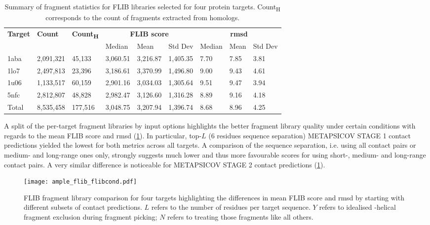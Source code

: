 \begin{table}[H]
  \centering
  \scriptsize
  \caption[FLIB fragment characterics across four protein targets]{Summary of fragment statistics for FLIB libraries selected for four protein targets. Count\textsubscript{H} corresponds to the count of fragments extracted from homologs.}
  \label{table:ample_flib_frag_summary}
  \begin{tabularx}{\textwidth}{X X X X X X X X X}
      \hline
      \multirow{2}{*}{\textbf{Target}} & \multirow{2}{*}{\textbf{Count}} & \multirow{2}{*}{\textbf{Count\textsubscript{H}}} & \multicolumn{3}{c}{\textbf{FLIB score}} & \multicolumn{3}{c}{\textbf{\gls{rmsd}}} \\ \cline{4-9}
      		&			&			& Median 	& Mean 		& Std Dev 	& Median 	& Mean 	& Std Dev \\
      \hline
      1aba	& 2,091,321	& 45,133		& 3,060.51	& 3,216.87	& 1,405.35	& 7.70	& 7.85	& 3.81	\\
	  1lo7	& 2,497,813	& 23,396		& 3,186.61	& 3,370.99	& 1,496.80	& 9.00	& 9.43	& 4.61	\\
      1u06	& 1,133,517	& 60,159		& 2,901.16	& 3,034.03	& 1,305.64	& 9.51	& 9.47	& 3.94	\\
      5nfc	& 2,812,807	& 48,828		& 2,982.47	& 3,126.60	& 1,316.28	& 8.89	& 9.16	& 4.18	\\
      \hline
      Total	& 8,535,458	& 177,516	& 3,048.75	& 3,207.94	& 1,396.74	& 8.68	& 8.96	& 4.25	\\
      \hline
  \end{tabularx}
\end{table}

A split of the per-target fragment libraries by input options highlights the better fragment library quality under certain conditions with regards to the mean FLIB score and \gls{rmsd} (\cref{fig:ample_flib_flibcond}). In particular, top-$L$ (6 residues sequence separation) METAPSICOV STAGE 1 contact predictions yielded the lowest for both metrics across all targets. A comparison of the sequence separation, i.e. using all contact pairs or medium- and long-range ones only, strongly suggests much lower and thus more favourable scores for using short-, medium- and long-range contact pairs. A very similar difference is noticeable for METAPSICOV STAGE 2 contact predictions (\cref{fig:ample_flib_flibcond}). 

\begin{figure}[H]
	\centering
	\texttt{[image: ample\_flib\_flibcond.pdf]}
	\caption[FLIB fragment library comparison]{FLIB fragment library comparison for four targets highlighting the differences in mean FLIB score and \gls{rmsd} by starting with different subsets of contact predictions. $L$ refers to the number of residues per target sequence. $Y$ refers to idealised \textalpha-helical fragment exclusion during fragment picking; $N$ refers to treating those fragments like all others.}
	\label{fig:ample_flib_flibcond}
\end{figure}

